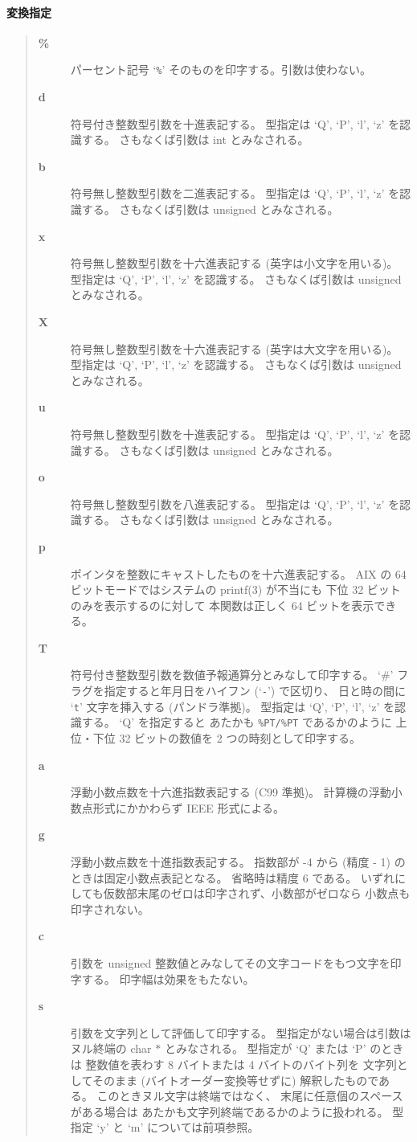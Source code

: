 \paragraph{変換指定}
\begin{quote}\begin{description}
\item[{\bf \%}] パーセント記号 `{\tt \%}' そのものを印字する。引数は使わない。
\item[{\bf d}] 
符号付き整数型引数を十進表記する。
型指定は `Q', `P', `l', `z' を認識する。
さもなくば引数は int とみなされる。
\item[{\bf b}] 
符号無し整数型引数を二進表記する。
型指定は `Q', `P', `l', `z' を認識する。
さもなくば引数は unsigned とみなされる。
\item[{\bf x}] 
符号無し整数型引数を十六進表記する (英字は小文字を用いる)。
型指定は `Q', `P', `l', `z' を認識する。
さもなくば引数は unsigned とみなされる。
\item[{\bf X}] 
符号無し整数型引数を十六進表記する (英字は大文字を用いる)。
型指定は `Q', `P', `l', `z' を認識する。
さもなくば引数は unsigned とみなされる。
\item[{\bf u}] 
符号無し整数型引数を十進表記する。
型指定は `Q', `P', `l', `z' を認識する。
さもなくば引数は unsigned とみなされる。
\item[{\bf o}] 
符号無し整数型引数を八進表記する。
型指定は `Q', `P', `l', `z' を認識する。
さもなくば引数は unsigned とみなされる。
\item[{\bf p}] 
ポインタを整数にキャストしたものを十六進表記する。
AIX の 64 ビットモードではシステムの printf(3) が不当にも
下位 32 ビットのみを表示するのに対して
本関数は正しく 64 ビットを表示できる。
\item[{\bf T}] 
符号付き整数型引数を数値予報通算分とみなして印字する。
`\#' フラグを指定すると年月日をハイフン (`{\tt -}') で区切り、
日と時の間に `{\tt t}' 文字を挿入する (パンドラ準拠)。
型指定は `Q', `P', `l', `z' を認識する。
`Q' を指定すると
あたかも {\tt \%PT/\%PT} であるかのように
上位・下位 32 ビットの数値を 2 つの時刻として印字する。
\item[{\bf a}] 
浮動小数点数を十六進指数表記する (C99 準拠)。
計算機の浮動小数点形式にかかわらず IEEE 形式による。
\item[{\bf g}] 
浮動小数点数を十進指数表記する。
指数部が -4 から (精度 - 1) のときは固定小数点表記となる。
省略時は精度 6 である。
いずれにしても仮数部末尾のゼロは印字されず、小数部がゼロなら
小数点も印字されない。
\item[{\bf c}] 
引数を unsigned 整数値とみなしてその文字コードをもつ文字を印字する。
印字幅は効果をもたない。
\item[{\bf s}] 
引数を文字列として評価して印字する。
型指定がない場合は引数はヌル終端の char $\ast$ とみなされる。
型指定が `Q' または `P' のときは
整数値を表わす 8 バイトまたは 4 バイトのバイト列を
文字列としてそのまま (バイトオーダー変換等せずに) 解釈したものである。
このときヌル文字は終端ではなく、
末尾に任意個のスペースがある場合は
あたかも文字列終端であるかのように扱われる。
型指定 `y' と `m' については前項参照。
\end{description}\end{quote}

